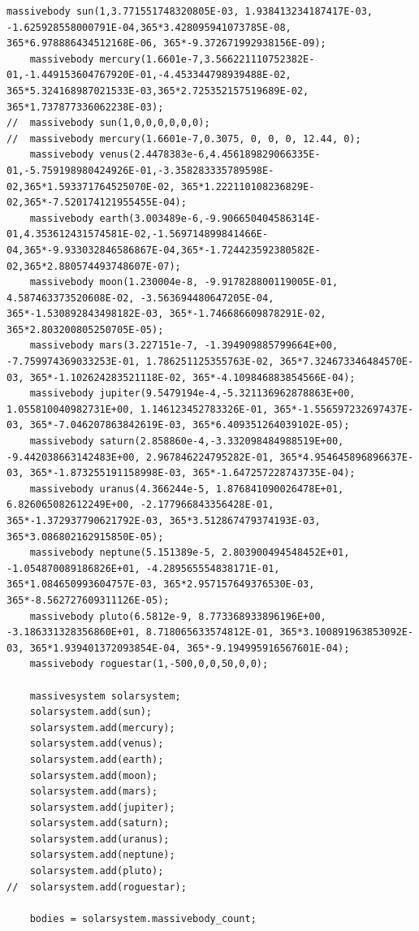 \documentclass[11pt,a4paper]{article}
\begin{document}
\begin{lstlisting}[title={project3-unittest.cpp}]
	massivebody sun(1,3.771551748320805E-03, 1.938413234187417E-03, -1.625928558000791E-04,365*3.428095941073785E-08, 365*6.978886434512168E-06, 365*-9.372671992938156E-09);
	massivebody mercury(1.6601e-7,3.566221110752382E-01,-1.449153604767920E-01,-4.453344798939488E-02, 365*5.324168987021533E-03,365*2.725352157519689E-02, 365*1.737877336062238E-03);
//	massivebody sun(1,0,0,0,0,0,0);
//	massivebody mercury(1.6601e-7,0.3075, 0, 0, 0, 12.44, 0);
	massivebody venus(2.4478383e-6,4.456189829066335E-01,-5.759198980424926E-01,-3.358283335789598E-02,365*1.593371764525070E-02, 365*1.222110108236829E-02,365*-7.520174121955455E-04);
	massivebody earth(3.003489e-6,-9.906650404586314E-01,4.353612431574581E-02,-1.569714899841466E-04,365*-9.933032846586867E-04,365*-1.724423592380582E-02,365*2.880574493748607E-07);
	massivebody moon(1.230004e-8, -9.917828800119005E-01, 4.587463373520608E-02, -3.563694480647205E-04, 365*-1.530892843498182E-03, 365*-1.746686609878291E-02, 365*2.803200805250705E-05);
	massivebody mars(3.227151e-7, -1.394909885799664E+00, -7.759974369033253E-01, 1.786251125355763E-02, 365*7.324673346484570E-03, 365*-1.102624283521118E-02, 365*-4.109846883854566E-04);
	massivebody jupiter(9.5479194e-4,-5.321136962878863E+00, 1.055810040982731E+00, 1.146123452783326E-01, 365*-1.556597232697437E-03, 365*-7.046207863842619E-03, 365*6.409351264039102E-05);
	massivebody saturn(2.858860e-4,-3.332098484988519E+00, -9.442038663142483E+00, 2.967846224795282E-01, 365*4.954645896896637E-03, 365*-1.873255191158998E-03, 365*-1.647257228743735E-04);
	massivebody uranus(4.366244e-5, 1.876841090026478E+01, 6.826065082612249E+00, -2.177966843356428E-01, 365*-1.372937790621792E-03, 365*3.512867479374193E-03, 365*3.086802162915850E-05);
	massivebody neptune(5.151389e-5, 2.803900494548452E+01, -1.054870089186826E+01, -4.289565554838171E-01, 365*1.084650993604757E-03, 365*2.957157649376530E-03, 365*-8.562727609311126E-05);
	massivebody pluto(6.5812e-9, 8.773368933896196E+00, -3.186331328356860E+01, 8.718065633574812E-01, 365*3.100891963853092E-03, 365*1.939401372093854E-04, 365*-9.194995916567601E-04);
	massivebody roguestar(1,-500,0,0,50,0,0);

	massivesystem solarsystem;
	solarsystem.add(sun);
	solarsystem.add(mercury);
	solarsystem.add(venus);
	solarsystem.add(earth);
	solarsystem.add(moon);
	solarsystem.add(mars);
	solarsystem.add(jupiter);
	solarsystem.add(saturn);
	solarsystem.add(uranus);
	solarsystem.add(neptune);
	solarsystem.add(pluto);
//	solarsystem.add(roguestar);

	bodies = solarsystem.massivebody_count;


\end{lstlisting}
\end{document}
